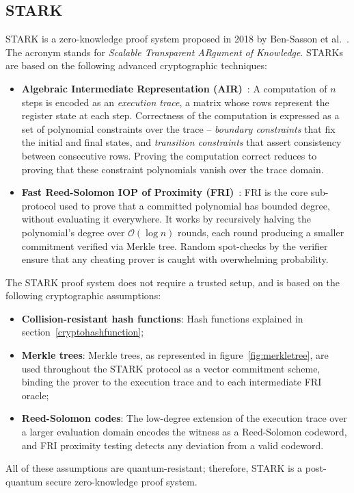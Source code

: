 \documentclass[binding=0.6cm,oneside,noexaminfo]{sapthesis}
\begin{document}
\subsection{STARK}
\label{STARK}
STARK is a zero-knowledge proof system proposed in 2018 by Ben-Sasson et al.~\cite{BenSasson2018STARK}.
The acronym stands for \emph{Scalable Transparent ARgument of Knowledge}.
STARKs are based on the following advanced cryptographic techniques:
\begin{itemize}
  \item \textbf{Algebraic Intermediate Representation (AIR)}~\cite{BenSasson2018STARK}: A computation of
  $n$ steps is encoded as an \emph{execution trace}, a matrix whose rows represent the register state at
  each step. Correctness of the computation is expressed as a set of polynomial constraints over the trace
  -- \emph{boundary constraints} that fix the initial and final states, and \emph{transition constraints}
  that assert consistency between consecutive rows. Proving the computation correct reduces to proving that
  these constraint polynomials vanish over the trace domain.
  \item \textbf{Fast Reed-Solomon IOP of Proximity (FRI)}~\cite{BenSasson2018FRI}: FRI is the core
  sub-protocol used to prove that a committed polynomial has bounded degree, without evaluating it
  everywhere. It works by recursively halving the polynomial's degree over $\mathcal{O}(\log n)$ rounds,
  each round producing a smaller commitment verified via Merkle tree. Random spot-checks by the verifier
  ensure that any cheating prover is caught with overwhelming probability.
\end{itemize}

The STARK proof system does not require a trusted setup, and is based on the following cryptographic
assumptions:
\begin{itemize}
  \item \textbf{Collision-resistant hash functions}: Hash functions explained in section~\ref{cryptohashfunction};
  \item \textbf{Merkle trees}: Merkle trees, as represented in figure~\ref{fig:merkletree}, are used throughout
  the STARK protocol as a vector commitment scheme, binding the prover to the execution trace and to each
  intermediate FRI oracle;
  \item \textbf{Reed-Solomon codes}: The low-degree extension of the execution trace over a larger evaluation
  domain encodes the witness as a Reed-Solomon codeword, and FRI proximity testing detects any deviation
  from a valid codeword.
\end{itemize}
All of these assumptions are quantum-resistant; therefore, STARK is a post-quantum secure zero-knowledge
proof system.
\end{document}
